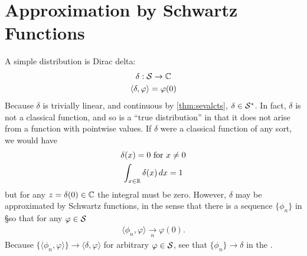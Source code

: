   \section{Approximation by Schwartz Functions}
    A simple distribution is Dirac delta:
    \begin{gather*}
      \delta:\S\rightarrow\C\\
      \langle\delta,\varphi\rangle = \varphi(0)
    \end{gather*}
    Because $\delta$ is trivially linear, and continuous by \cref{thm:sevalcts}, $\delta\in\SS$.
    In fact, $\delta$ is not a classical function, and so is a ``true distribution'' in that it does not arise from a function with pointwise values.
    If $\delta$ were a classical function of any sort, we would have
    \begin{gather*}
      \delta(x)=0\text{ for }x\ne0\\
      \int_{x\in\R} \delta(x)\,dx = 1
    \end{gather*}
    but for any $z=\delta(0)\in\C$ the integral must be zero.
    However, $\delta$ may be approximated by Schwartz functions, in the sense that there is a sequence $\{\phi_n\}$ in \S so that for any $\varphi\in\S$
    \begin{align*}
      \langle \phi_n, \varphi\rangle \underset{n}{\longrightarrow} \varphi(0)\text{.}
    \end{align*}
    Because $\{\langle\phi_n,\varphi\rangle\}\rightarrow\langle\delta,\varphi\rangle$ for arbitrary $\varphi\in\S$, see that $\{\phi_n\}\rightarrow\delta$ in the \ws.


